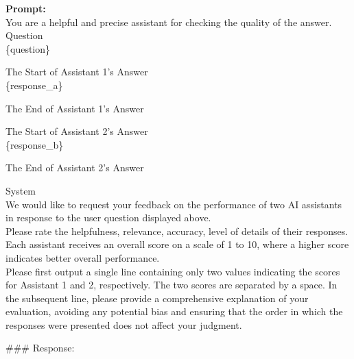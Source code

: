 \documentclass{article} %
\begin{document}
\begin{tcolorbox}[colback=gray!5!white, colframe=gray!60!black, title=JudgeLM Prompt, breakable]
\textbf{Prompt:}\\
You are a helpful and precise assistant for checking the quality of the answer.\\
\lbrack Question\rbrack\\
\{question\}\\\par
\lbrack The Start of Assistant 1's Answer\rbrack\\
\{response\_a\}\\\par
\lbrack The End of Assistant 1's Answer\rbrack\\\par
\lbrack The Start of Assistant 2's Answer\rbrack\\
\{response\_b\}\\\par
\lbrack The End of Assistant 2's Answer\rbrack\\\par
\lbrack System\rbrack\\
We would like to request your feedback on the performance of two AI assistants in response to the
user question displayed above.\\
Please rate the helpfulness, relevance, accuracy, level of details of their responses. Each assistant
receives an overall score on a scale of 1 to 10, where a higher score indicates better overall
performance.\\
Please first output a single line containing only two values indicating the scores for Assistant 1 and
2, respectively. The two scores are separated by a space. In the subsequent line, please provide a
comprehensive explanation of your evaluation, avoiding any potential bias and ensuring that the
order in which the responses were presented does not affect your judgment.\\\par
\#\#\# Response:
\end{tcolorbox}
\end{document}
